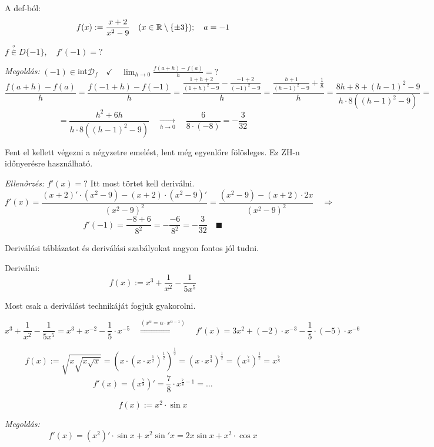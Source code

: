 \documentclass[a4paper,11.5pt]{article}
\begin{document}
	\begin{task}
		A def-ból:
		\[ f(x):=\frac{x+2}{x^2-9}\quad (x\in\mathbb{R}\setminus\{\pm3 \});\quad a=-1 \]
		
		$f\overset{?}{\in}D\{-1\},\quad f'(-1)=?$
		\medskip
		
		\textit{Megoldás:} $(-1)\in$int$\mathcal{D}_f\quad \checkmark\quad \lim_{h\to0}\frac{f(a+h)-f(a)}{h}=?$
		\[ \frac{f(a+h)-f(a)}{h}=\frac{f(-1+h)-f(-1)}{h}=\frac{\frac{1+h+2}{(1+h)^2-9}-\frac{-1+2}{(-1)^2-9}}{h}=\frac{\frac{h+1}{(h-1)^2-9}+\frac{1}{8}}{h}=\frac{8h+8+(h-1)^2-9}{h\cdot8\left((h-1)^2-9\right)} =\]
		\[=\frac{h^2+6h}{h\cdot8\left((h-1)^2-9\right)}\quad \underset{h\to0}{\longrightarrow} \quad \frac{6}{8\cdot(-8)}=-\frac{3}{32} \]
		\begin{note}
			Fent el kellett végezni a négyzetre emelést, lent még egyenlőre fölösleges. Ez ZH-n időnyerésre használható.
		\end{note}
		\textit{Ellenőrzés:} $f'(x)=?$ Itt most törtet kell deriválni.
		\[ f'(x)=\frac{(x+2)'\cdot(x^2-9)-(x+2)\cdot(x^2-9)'}{(x^2-9)^2} = \frac{(x^2-9)-(x+2)\cdot2x}{(x^2-9)^2}\quad \Rightarrow\]
		\[ f'(-1)=\frac{-8+6}{8^2}=-\frac{-6}{8^2}=-\frac{3}{32}\quad \blacksquare \]
	\end{task}
	\begin{note}
		Deriválási táblázatot és deriválási szabályokat nagyon fontos jól tudni.
	\end{note}
	\begin{task}
		Deriválni:
		\[ f(x):=x^3+\frac{1}{x^2}-\frac{1}{5x^5} \]
		\begin{note}
			Most csak a deriválást technikáját fogjuk gyakorolni.
		\end{note}
		\[ x^3+\frac{1}{x^2}-\frac{1}{5x^5}=x^3+x^{-2}-\frac{1}{5}\cdot x^{-5}\quad \overset{(x^\alpha=\alpha\cdot x^{\alpha-1})}{\Rightarrow}\quad f'(x) =3x^2+(-2)\cdot x^{-3}-\frac{1}{5}\cdot(-5)\cdot x^{-6} \]
	\end{task}
	\begin{task}
		\[ f(x):=\sqrt{x\sqrt{x\sqrt{x}}}=\left(x\cdot\left(x\cdot x^{\frac{1}{2}}\right)^{\frac{1}{2}}\right)^{\frac{1}{2}}=(x\cdot x^{\frac{3}{4}})^{\frac{1}{2}}=(x^{\frac{7}{4}})^{\frac{1}{2}}=x^{\frac{7}{8}} \]
		\[ f'(x)=\left(x^{\frac{7}{8}}\right)'=\frac{7}{8}\cdot x^{\frac{7}{8}-1}=\ldots \]
	\end{task}
	\begin{task}
		\[f(x) :=x^2\cdot\sin x \]
		\medskip
		
		\textit{Megoldás:}
		\[ f'(x)=(x^2)'\cdot\sin x+x^2\sin'x=2x\sin x+x^2\cdot \cos x \]
	\end{task}
\end{document}
